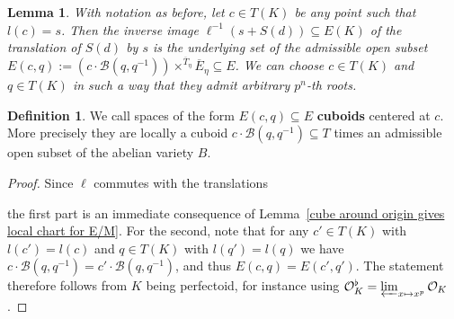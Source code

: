 \documentclass[11pt,oneside]{amsart}
\newtheorem{lemma}[theorem]{Lemma}
\theoremstyle{definition}
\newtheorem{definition}[theorem]{Definition}
\theoremstyle{remark}
\begin{document}
	\begin{lemma}\label{cube around point gives local chart for E/M}
		With notation as before, let $c \in T(K)$ be any point such that $l(c)=s$. Then the inverse image $\ell^{-1}(s+S(d))\subseteq E(K)$ of the translation of $S(d)$ by $s$ is the underlying set of the admissible open subset $E(c,q) := (c\cdot \mathcal B(q,q^{-1}))\times^{\overline{T}_\eta}\overline{E}_\eta \subseteq E$. We can choose $c\in T(K)$ and $q\in T(K)$ in such a way that they admit arbitrary $p^n$-th roots.
	\end{lemma}
	\begin{definition}\label{defininition of cuboid}
		We call spaces of the form $E(c,q)\subseteq E$ \textbf{cuboids} centered at $c$. More precisely they are locally a cuboid   $c\cdot\mathcal B(q,q^{-1})\subseteq T$ times an admissible open subset of the abelian variety $B$. 
	\end{definition}
	
	\begin{proof}
		Since $\ell$ commutes with the translations
		\begin{center}
		\end{center}
		the first part is an immediate consequence of Lemma~\ref{cube around origin gives local chart for E/M}. For the second, note that for any $c'\in T(K)$ with $l(c')=l(c)$ and $q\in T(K)$ with $l(q')=l(q)$ we have $c\cdot \mathcal B(q,q^{-1}) = c'\cdot \mathcal B(q,q^{-1})$, and thus $E(c,q)=E(c',q')$. The statement therefore follows from $K$ being perfectoid, for instance using $\mathcal O_K^\flat = \varprojlim_{x\mapsto x^p}\mathcal O_K$.
	\end{proof}
	 
\end{document}
